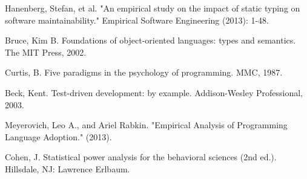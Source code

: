 \documentclass[]{sigplanconf}
\begin{document}
\begin{thebibliography}{}
Hanenberg, Stefan, et al. "An empirical study on the impact of static typing on software maintainability." Empirical Software Engineering (2013): 1-48.

Bruce, Kim B. Foundations of object-oriented languages: types and semantics. The MIT Press, 2002.

Curtis, B. Five paradigms in the psychology of programming. MMC, 1987.

Beck, Kent. Test-driven development: by example. Addison-Wesley Professional, 2003.

Meyerovich, Leo A., and Ariel Rabkin. "Empirical Analysis of Programming Language Adoption." (2013).

Cohen, J. Statistical power analysis for the behavioral sciences (2nd ed.). Hillsdale, NJ: Lawrence Erlbaum.

\end{thebibliography}
\end{document}
